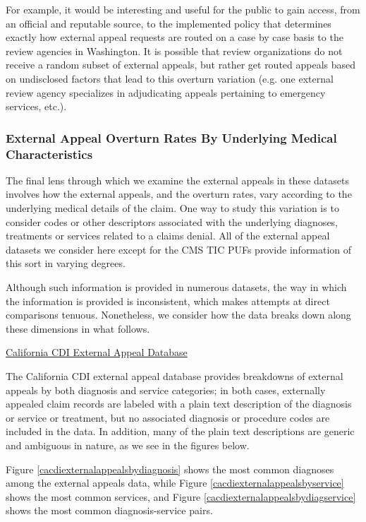 \documentclass[12pt, a4paper,twoside,parskip=full]{report}
\theoremstyle{plain} %
\theoremstyle{definition} %
\theoremstyle{remark} %
\numberwithin{equation}{chapter}
\begin{document}
		For example, it would be interesting and useful for the public to gain access, from an official and reputable source, to the implemented policy that determines exactly how external appeal requests are routed on a case by case basis to the review agencies in Washington. It is possible that review organizations do not receive a random subset of external appeals, but rather get routed appeals based on undisclosed factors that lead to this overturn variation (e.g. one external review agency specializes in adjudicating appeals pertaining to emergency services, etc.).
		
		\subsubsection{External Appeal Overturn Rates By Underlying Medical Characteristics}
		
		The final lens through which we examine the external appeals in these datasets involves how the external appeals, and the overturn rates, vary according to the underlying medical details of the claim. One way to study this variation is to consider codes or other descriptors associated with the underlying diagnoses, treatments or services related to a claims denial. All of the external appeal datasets we consider here except for the CMS TIC PUFs provide information of this sort in varying degrees.
		
		Although such information is provided in numerous datasets, the way in which the information is provided is inconsistent, which makes attempts at direct comparisons tenuous. Nonetheless, we consider how the data breaks down along these dimensions in what follows.
		
		\underline{California CDI External Appeal Database}
		
		The California CDI external appeal database provides breakdowns of external appeals by both diagnosis and service categories; in both cases, externally appealed claim records are labeled with a plain text description of the diagnosis or service or treatment, but no associated diagnosis or procedure codes are included in the data. In addition, many of the plain text descriptions are generic and ambiguous in nature, as we see in the figures below.
		
		Figure \ref{cacdiexternalappealsbydiagnosis} shows the most common diagnoses among the external appeals data, while Figure \ref{cacdiexternalappealsbyservice} shows the most common services, and Figure \ref{cacdiexternalappealsbydiagservice} shows the most common diagnosis-service pairs.
		
\end{document}
